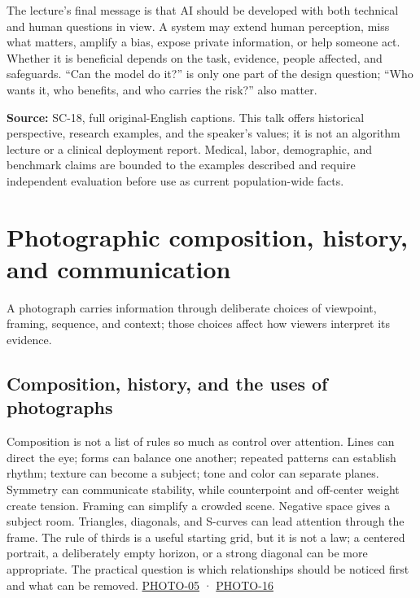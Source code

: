 The lecture's final message is that AI should be developed with both technical and human questions in view. A system may extend human perception, miss what matters, amplify a bias, expose private information, or help someone act. Whether it is beneficial depends on the task, evidence, people affected, and safeguards. ``Can the model do it?'' is only one part of the design question; ``Who wants it, who benefits, and who carries the risk?'' also matter.

\textbf{Source:} SC-18, full original-English captions. This talk offers historical perspective, research examples, and the speaker's values; it is not an algorithm lecture or a clinical deployment report. Medical, labor, demographic, and benchmark claims are bounded to the examples described and require independent evaluation before use as current population-wide facts.

\section{Photographic composition, history, and communication}\label{04-visual-computing-ii-ch034-photographic-composition-history-and-communication}

A photograph carries information through deliberate choices of viewpoint, framing, sequence, and context; those choices affect how viewers interpret its evidence.

\subsection{Composition, history, and the uses of photographs}\label{04-visual-computing-ii-ch034-composition-history-and-the-uses-of-photographs}

Composition is not a list of rules so much as control over attention. Lines can direct the eye; forms can balance one another; repeated patterns can establish rhythm; texture can become a subject; tone and color can separate planes. Symmetry can communicate stability, while counterpoint and off-center weight create tension. Framing can simplify a crowded scene. Negative space gives a subject room. Triangles, diagonals, and S-curves can lead attention through the frame. The rule of thirds is a useful starting grid, but it is not a law; a centered portrait, a deliberately empty horizon, or a strong diagonal can be more appropriate. The practical question is which relationships should be noticed first and what can be removed. \hyperref[04-visual-computing-ii-ch036-photo-05---photography-session-05]{PHOTO-05} · \hyperref[04-visual-computing-ii-ch036-photo-16---photography-session-16]{PHOTO-16}

